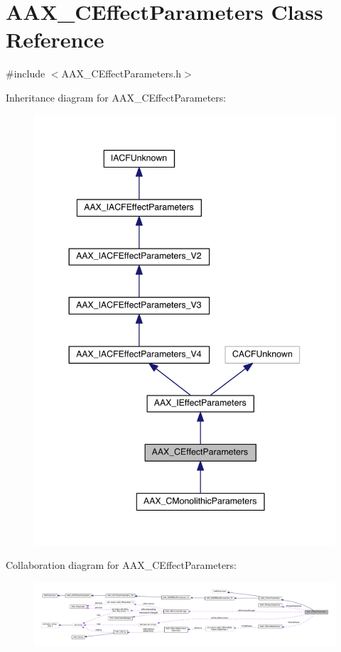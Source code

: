 \hypertarget{a00018}{}\section{A\+A\+X\+\_\+\+C\+Effect\+Parameters Class Reference}
\label{a00018}


{\ttfamily \#include $<$A\+A\+X\+\_\+\+C\+Effect\+Parameters.\+h$>$}



Inheritance diagram for A\+A\+X\+\_\+\+C\+Effect\+Parameters\+:
\nopagebreak
\begin{figure}[H]
\begin{center}
\leavevmode
\includegraphics[width=344pt]{a00417}
\end{center}
\end{figure}


Collaboration diagram for A\+A\+X\+\_\+\+C\+Effect\+Parameters\+:
\nopagebreak
\begin{figure}[H]
\begin{center}
\leavevmode
\includegraphics[width=350pt]{a00418}
\end{center}
\end{figure}


